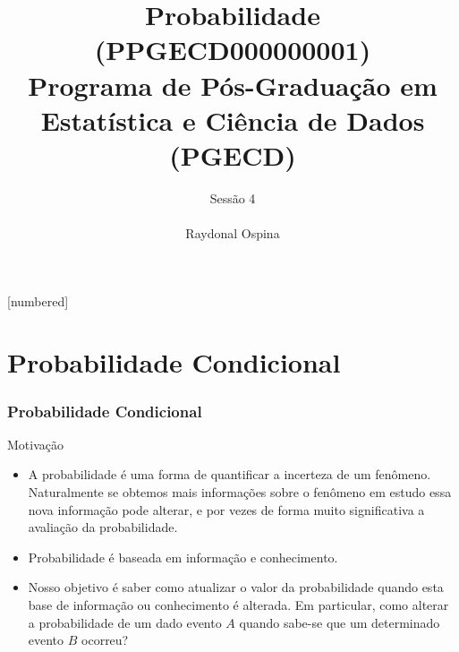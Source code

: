 


[numbered]



\hypersetup{colorlinks,linkcolor=,urlcolor=links}


\graphicspath{{./graphics/}} 			%

\newcommand{\cor}[1]{ \{{#1}\}}


\title[Probabilidade]{  Probabilidade (PPGECD000000001) \\ \vspace{1cm}Programa de Pós-Graduação em Estatística e Ciência de Dados (PGECD) }
\author[ Raydonal Ospina 
\ ]{
	Sessão 4 \\
	${}$ \\
	Raydonal Ospina  }

\date[]{}






\begin{frame}
  \titlepage
\end{frame}


\section{Probabilidade Condicional}
\begin{frame}
\frametitle{Probabilidade Condicional}

\vspace{1cm}
\begin{block}{Motivação}
	\begin{itemize}
	
\item 	A probabilidade é uma forma de quantificar a incerteza de um fenômeno. Naturalmente se obtemos mais informações sobre o fenômeno em estudo essa nova informação pode alterar,  e por vezes de forma muito significativa a avaliação da probabilidade. 
	
\item Probabilidade é baseada em informação e conhecimento. 
	
\item Nosso objetivo é saber como atualizar o valor da probabilidade quando esta base de informação ou conhecimento é alterada. Em particular, como alterar a probabilidade de um dado evento $A$ quando sabe-se que um determinado evento $B$
	ocorreu?
	\end{itemize}
\end{block}
\end{frame}

